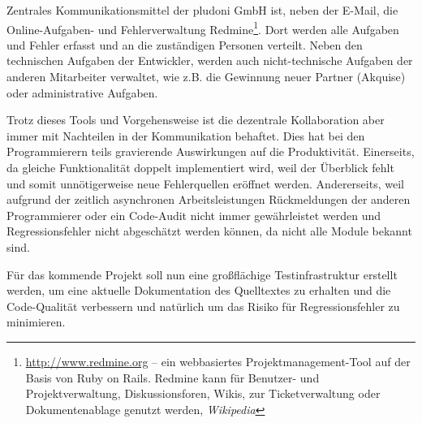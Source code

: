 Zentrales Kommunikationsmittel der pludoni GmbH ist, neben der E-Mail, die Online-Aufgaben- und Fehlerverwaltung Redmine\footnote{\url{http://www.redmine.org} -- ein webbasiertes Projektmanagement-Tool auf der Basis von Ruby on Rails. Redmine kann für Benutzer- und Projektverwaltung, Diskussionsforen, Wikis, zur Ticketverwaltung oder Dokumentenablage genutzt werden, \textit{Wikipedia}}. Dort werden alle Aufgaben und Fehler erfasst und an die zuständigen Personen verteilt.
Neben den technischen Aufgaben der Entwickler, werden auch nicht-technische Aufgaben der anderen Mitarbeiter verwaltet, wie z.B. die Gewinnung neuer Partner (Akquise) oder administrative Aufgaben.

Trotz dieses Tools und Vorgehensweise ist die dezentrale Kollaboration aber immer mit Nachteilen in der Kommunikation behaftet. Dies hat bei den Programmierern teils gravierende Auswirkungen auf die Produktivität. Einerseits, da gleiche Funktionalität doppelt implementiert wird, weil der Überblick fehlt und somit unnötigerweise neue Fehlerquellen eröffnet werden. Andererseits, weil aufgrund der zeitlich asynchronen Arbeitsleistungen Rückmeldungen der anderen Programmierer oder ein Code-Audit nicht immer gewährleistet werden und Regressionsfehler nicht abgeschätzt werden können, da nicht alle Module bekannt sind.


Für das kommende Projekt soll nun eine großflächige Testinfrastruktur erstellt werden, um eine aktuelle Dokumentation des Quelltextes zu erhalten und die Code-Qualität verbessern und natürlich um das Risiko für Regressionsfehler zu minimieren.
